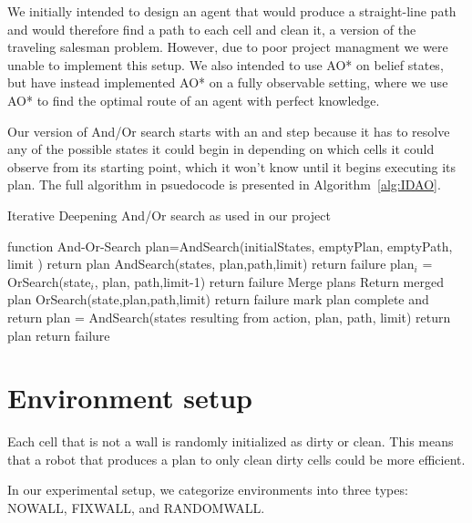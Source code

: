 \documentclass{article}
\begin{document}
We initially intended to design an agent that would produce a straight-line path and would therefore find a path to each cell and clean it, a version of the traveling salesman problem. However, due to poor project managment we were unable to implement this setup. We also intended to use AO* on belief states, but have instead implemented AO* on a fully observable setting, where we use AO* to find the optimal route of an agent with perfect knowledge.

Our version of And/Or search starts with an and step because it has to resolve any of the possible states it could begin in depending on which cells it could observe from its starting point, which it won't know until it begins executing its plan. The full algorithm in psuedocode is presented in Algorithm~\ref{alg:IDAO}. 
\begin{algorithm}[h]
  \caption{Iterative Deepening And/Or search as used in our project}
  \begin{algorithmic}[1]
    \State function And-Or-Search
      \State plan=AndSearch(initialStates, emptyPlan, emptyPath, limit )
        \State return plan
      \EndIf
    \EndFor
    \State
    \State AndSearch(states, plan,path,limit)
      \State return failure
    \EndIf
     \State plan$_i$ = OrSearch(state$_i$, plan, path,limit-1)
        \State return failure
      \EndIf
      \State Merge plans
    \EndFor
    \State Return merged plan
    \State
    \State OrSearch(state,plan,path,limit)
      \State return failure
    \EndIf
      \State mark plan complete and return
    \EndIf
      \State plan = AndSearch(states resulting from action, plan, path, limit)
        \State return plan
      \EndIf
    \EndFor
    \State return failure
  \end{algorithmic}
  \label{alg:IDAO}
\end{algorithm}

\section{Environment setup}
Each cell that is not a wall is randomly initialized as dirty or clean. This means that a robot that produces a plan to only clean dirty cells could be more efficient.

In our experimental setup, we categorize environments into three types: NOWALL, FIXWALL, and RANDOMWALL.
\end{document}
